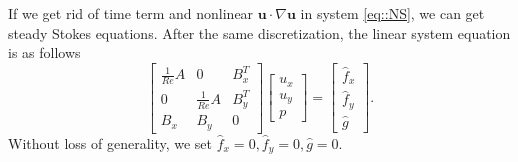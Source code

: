 \documentclass[mathpazo]{aamm}
\begin{document}
   If we get rid of time term and nonlinear $\mathbf{u} \cdot \nabla
   \mathbf{u}$ in system \eqref{eq::NS}, we can get steady Stokes
   equations. After the same discretization, the linear system equation
   is as follows
   \begin{equation}
     \left[
       \begin{array}{lll}
         \frac{1}{Re} A & 0 & B_x^T \\
         0 & \frac{1}{Re} A  & B_y^T \\
         B_x & B_y & 0
       \end{array}
     \right]
     \left[
       \begin{array}{c}
          u_x \\
          u_y \\
          p
       \end{array}
     \right] = 
     \left[
       \begin{array}{c}
         \hat{f}_x \\
         \hat{f}_y \\
         \hat{g}
       \end{array}
     \right].
     \label{eq::linear_system_stokes}
   \end{equation}   
   Without loss of generality, we set $\hat{f}_x = 0, \hat{f}_y = 0, \hat{g} = 0$.


   
\end{document}
